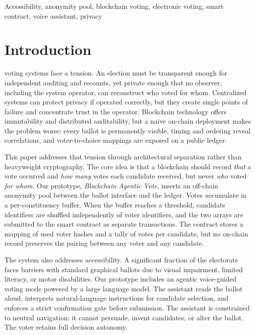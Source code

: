\documentclass{ieeeaccess}
\begin{document}
\begin{keywords}
Accessibility, anonymity pool, blockchain voting, electronic voting, smart contract, voice assistant, privacy
\end{keywords}

\titlepgskip=-15pt
\maketitle

\section{Introduction}
\label{sec:introduction}
 voting systems face a tension. An election must be transparent enough for independent auditing and recounts, yet private enough that no observer, including the system operator, can reconstruct who voted for whom. Centralized systems can protect privacy if operated correctly, but they create single points of failure and concentrate trust in the operator. Blockchain technology offers immutability and distributed auditability, but a naive on-chain deployment makes the problem worse: every ballot is permanently visible, timing and ordering reveal correlations, and voter-to-choice mappings are exposed on a public ledger.

This paper addresses that tension through architectural separation rather than heavyweight cryptography. The core idea is that a blockchain should record \emph{that} a vote occurred and \emph{how many} votes each candidate received, but never \emph{who} voted \emph{for whom}. Our prototype, \emph{Blockchain Agentic Vote}, inserts an off-chain anonymity pool between the ballot interface and the ledger. Votes accumulate in a per-constituency buffer. When the buffer reaches a threshold, candidate identifiers are shuffled independently of voter identifiers, and the two arrays are submitted to the smart contract as separate transactions. The contract stores a mapping of used voter hashes and a tally of votes per candidate, but no on-chain record preserves the pairing between any voter and any candidate.

The system also addresses accessibility. A significant fraction of the electorate faces barriers with standard graphical ballots due to visual impairment, limited literacy, or motor disabilities. Our prototype includes an agentic voice-guided voting mode powered by a large language model. The assistant reads the ballot aloud, interprets natural-language instructions for candidate selection, and enforces a strict confirmation gate before submission. The assistant is constrained to neutral navigation: it cannot persuade, invent candidates, or alter the ballot. The voter retains full decision autonomy.
\end{document}
